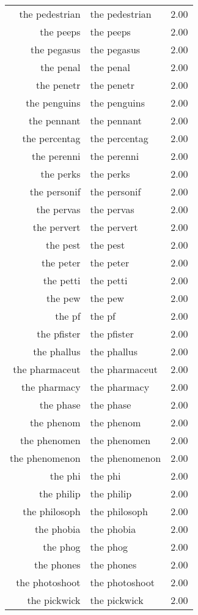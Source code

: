 \begin{table}[ht]
\begin{tabular}{rlr}
  the pedestrian & the pedestrian & 2.00 \\ 
  the peeps & the peeps & 2.00 \\ 
  the pegasus & the pegasus & 2.00 \\ 
  the penal & the penal & 2.00 \\ 
  the penetr & the penetr & 2.00 \\ 
  the penguins & the penguins & 2.00 \\ 
  the pennant & the pennant & 2.00 \\ 
  the percentag & the percentag & 2.00 \\ 
  the perenni & the perenni & 2.00 \\ 
  the perks & the perks & 2.00 \\ 
  the personif & the personif & 2.00 \\ 
  the pervas & the pervas & 2.00 \\ 
  the pervert & the pervert & 2.00 \\ 
  the pest & the pest & 2.00 \\ 
  the peter & the peter & 2.00 \\ 
  the petti & the petti & 2.00 \\ 
  the pew & the pew & 2.00 \\ 
  the pf & the pf & 2.00 \\ 
  the pfister & the pfister & 2.00 \\ 
  the phallus & the phallus & 2.00 \\ 
  the pharmaceut & the pharmaceut & 2.00 \\ 
  the pharmacy & the pharmacy & 2.00 \\ 
  the phase & the phase & 2.00 \\ 
  the phenom & the phenom & 2.00 \\ 
  the phenomen & the phenomen & 2.00 \\ 
  the phenomenon & the phenomenon & 2.00 \\ 
  the phi & the phi & 2.00 \\ 
  the philip & the philip & 2.00 \\ 
  the philosoph & the philosoph & 2.00 \\ 
  the phobia & the phobia & 2.00 \\ 
  the phog & the phog & 2.00 \\ 
  the phones & the phones & 2.00 \\ 
  the photoshoot & the photoshoot & 2.00 \\ 
  the pickwick & the pickwick & 2.00 \\ 

\end{tabular}
\end{table}
